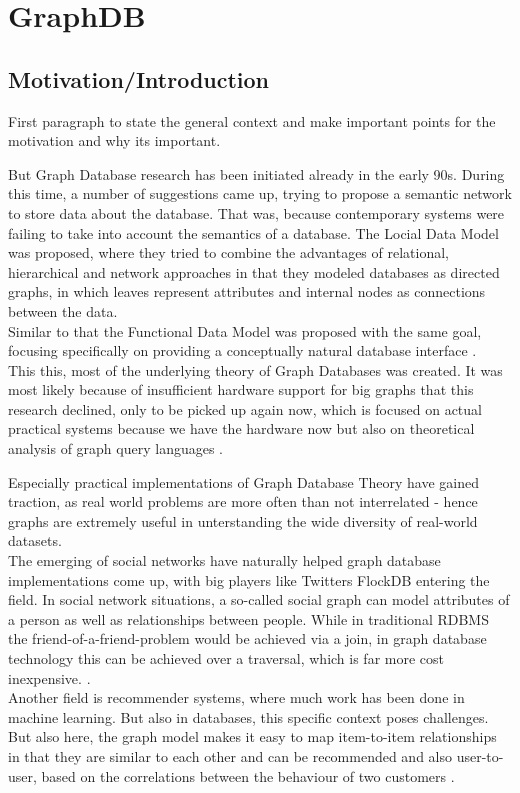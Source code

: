 \chapter{GraphDB}

\section{Motivation/Introduction}
First paragraph to state the general context and make important points for the motivation and why its important.

But Graph Database research has been initiated already in the early 90s. During this time, a number of suggestions came up, trying to  propose a semantic network to store data about the database. That was, because contemporary systems were failing to take into account the semantics of a database.
The Locial Data Model \cite{KUPERLDM} was proposed, where they tried to combine the advantages of relational, hierarchical and network approaches in that they modeled databases as directed graphs, in which leaves represent attributes and internal nodes as connections between the data. \\
Similar to that the Functional Data Model \cite{Shipman1979} was proposed with the same goal, focusing specifically on providing a conceptually natural database interface \cite{Angles2018AnIT}. \\
This this, most of the underlying theory of Graph Databases was created.
It was most likely because of insufficient hardware support for big graphs that this research declined, only to be picked up again now, which is focused on actual practical systems because we have the hardware now but also on theoretical analysis of graph query languages \cite{Angles2018AnIT}.

Especially practical implementations of Graph Database Theory have gained traction, as real world problems are more often than not interrelated - hence graphs are extremely useful in unterstanding the wide diversity of real-world datasets.\cite{Robinson2013} \\
The emerging of social networks have naturally helped graph database implementations come up, with big players like Twitters FlockDB entering the field. In social network situations, a so-called social graph can model attributes of a person as well as relationships between people. While in traditional RDBMS the friend-of-a-friend-problem would be achieved via a join, in graph database technology this can be achieved over a traversal, which is far more cost inexpensive. \cite{Miller2013GraphDA}. \\
Another field is recommender systems, where much work has been done in machine learning. But also in databases, this specific context poses challenges. But also here, the graph model makes it easy to map item-to-item relationships in that they are similar to each other and can be recommended and also user-to-user, based on the correlations between the behaviour of two customers \cite{Huang2002}.

